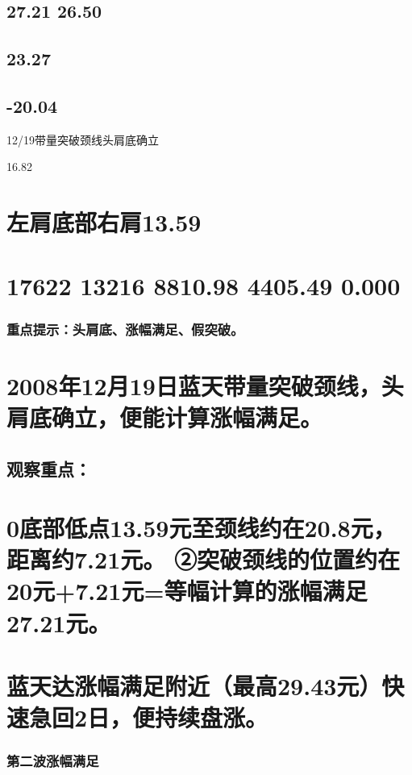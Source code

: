 \documentclass{article}
\begin{document}
\subsection{27.21 26.50}

\subsection{23.27}

\subsection{-20.04}

12/19带量突破颈线头肩底确立

16.82

\section{左肩底部右肩13.59}

\section{17622 13216 8810.98 4405.49 0.000}

\subsubsection{重点提示：头肩底、涨幅满足、假突破。}

\section{2008年12月19日蓝天带量突破颈线，头肩底确立，便能计算涨幅满足。}

\subsection{观察重点：}

\section{0底部低点13.59元至颈线约在20.8元，距离约7.21元。 ②突破颈线的位置约在20元+7.21元=等幅计算的涨幅满足27.21元。}

\section{蓝天达涨幅满足附近（最高29.43元）快速急回2日，便持续盘涨。}

\subsubsection{第二波涨幅满足}
\end{document}
